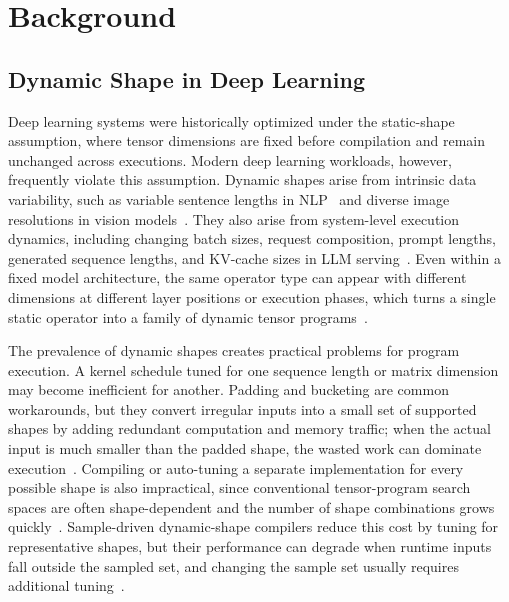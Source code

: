 \section{Background}%
\label{sec:background}


\subsection{Dynamic Shape in Deep Learning} 
\label{sec:dynamic-shape}


Deep learning systems were historically optimized under the static-shape assumption, 
where tensor dimensions are fixed before compilation and remain unchanged across executions. 
Modern deep learning 
workloads, however, frequently violate this assumption. Dynamic shapes arise from intrinsic data variability, 
such as variable sentence lengths in NLP~\cite{vaswani2017A,devlin2019bert} 
and diverse image resolutions in vision models~\cite{ren2015faster}. 
They also arise from system-level 
execution dynamics, including changing batch sizes, request composition, prompt lengths, generated sequence lengths, 
and KV-cache sizes in LLM serving~\cite{touvron2023llama,dao2022flashattention,jiang2024minference}. Even within 
a fixed model architecture, the same operator type can appear with different dimensions at different layer positions 
or execution phases, which turns a single static operator into a family of dynamic tensor programs~\cite{zheng2022dietcode,zhou2025helix}.

The prevalence of dynamic shapes creates practical problems for program execution. 
A kernel schedule tuned for one sequence length or matrix dimension may become inefficient 
for another. Padding and bucketing are common workarounds, but they convert irregular inputs into 
a small set of supported shapes by adding redundant computation and memory traffic; when the actual input is 
much smaller than the padded shape, the wasted work can dominate execution~\cite{fegade2022cora,mu2024ftuner}. 
Compiling or auto-tuning a separate implementation for every possible shape is also impractical, since conventional 
tensor-program search spaces are often shape-dependent and the number of shape combinations grows 
quickly~\cite{chen2018tvm,ragan2013halide,zheng2020ansor,zheng2022dietcode}. Sample-driven dynamic-shape compilers 
reduce this cost by tuning for representative shapes, but their performance can degrade when runtime inputs fall outside 
the sampled set, and changing the sample set usually requires additional tuning~\cite{shen2021nimble,zhou2025helix}.

